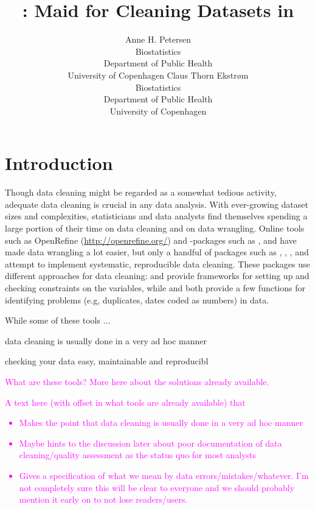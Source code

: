 \documentclass[article]{jss}
\author{Anne H. Petersen\\Biostatistics\\Department of Public
  Health\\University of Copenhagen \And Claus Thorn Ekstr\o m\\Biostatistics\\Department of Public
  Health\\University of Copenhagen}
\title{\pkg{cleanR}: Maid for Cleaning Datasets in \proglang{R}}
\newcommand{\hl}[1]{\textcolor{magenta}{#1}}
\begin{document}
\section{Introduction}
Though data cleaning might be regarded as a somewhat tedious activity,
adequate data cleaning is crucial in any data analysis. With
ever-growing dataset sizes and complexities, statisticians and data
analysts find themselves spending a large portion of their time on
data cleaning and on data wrangling. Online tools such as OpenRefine
(\url{http://openrefine.org/}) and -packages such as
, and  have made data wrangling a lot
easier, but only a handful of packages such as ,
, , and  attempt to
implement systematic, reproducible data cleaning.  These packages use
different approaches for data cleaning:  and
 provide frameworks for setting up and checking
constraints on the variables, while  and
 both provide a few functions for identifying problems
(e.g, duplicates, dates coded as numbers) in data.

While some of these tools ... 

data cleaning is usually done in a very ad hoc manner

 checking your data easy, maintainable and reproducibl


\hl{What are these tools? More here about the solutions
  already available.}



\hl{A text here (with offset in what tools are already available) that
\begin{itemize}
\item Makes the point that data cleaning is usually done in a very ad hoc manner
\item Maybe hints to the discussion later about poor documentation of data cleaning/quality assessment as the status quo for most analysts
\item Gives a specification of what we mean by data errors/mistakes/whatever. I'm not completely sure this will be clear to everyone and we should probably mention it early on to not lose readers/users.
\end{itemize}
}
\end{document}
